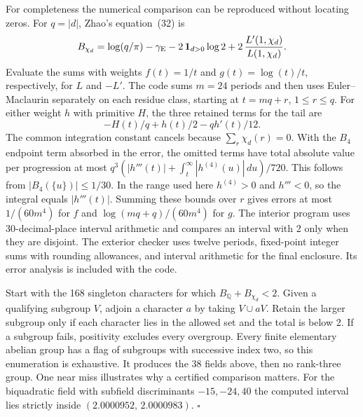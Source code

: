 \documentclass[11pt]{article}
\begin{document}
For completeness the numerical comparison can be reproduced without
locating zeros. For $q=|d|$, Zhao's equation~(32) is
\[
 B_{\chi_d}=\log(q/\pi)-\gamma_{\rm E}
      -2\,\mathbf{1}_{d>0}\log 2+
        2\,\frac{L'(1,\chi_d)}{L(1,\chi_d)} .
\]
Evaluate the sums with weights $f(t)=1/t$ and $g(t)=\log(t)/t$,
respectively, for $L$ and $-L'$. The code sums $m=24$ periods and then
uses Euler--Maclaurin separately on each residue class, starting at
$t=mq+r$, $1\le r\le q$. For either weight $h$ with primitive $H$, the
three retained terms for the tail are
\[
 -H(t)/q+h(t)/2-qh'(t)/12.
\]
The common integration constant cancels because $\sum_r\chi_d(r)=0$.
With the $B_4$ endpoint term absorbed in the error, the omitted terms
have total absolute value per progression at most
$q^3(|h'''(t)|+\int_t^\infty|h^{(4)}(u)|\,du)/720$.
This follows from $|B_4(\{u\})|\le 1/30$. In the range used here
$h^{(4)}>0$ and $h'''<0$, so the integral equals $|h'''(t)|$.
Summing these bounds over $r$ gives errors at most $1/(60m^4)$ for
$f$ and $\log(mq+q)/(60m^4)$ for $g$. The interior program uses 30-decimal-place
interval arithmetic and compares an interval with 2 only when they
are disjoint. The exterior checker uses twelve periods, fixed-point integer sums with rounding allowances, and interval arithmetic for the final enclosure. Its error analysis is included with the code.

Start with the 168 singleton characters for which
$B_{\mathbb Q}+B_{\chi_d}<2$. Given a qualifying subgroup $V$, adjoin a
character $a$ by taking $V\cup aV$. Retain the larger subgroup only if
each character lies in the allowed set and the total is below 2. If a
subgroup fails, positivity excludes every overgroup. Every finite
elementary abelian group has a flag of subgroups with successive index
two, so this enumeration is exhaustive. It produces the 38 fields above,
then no rank-three group. One near miss illustrates why a certified
comparison matters. For the biquadratic field with subfield discriminants
$-15,-24,40$ the computed interval lies strictly inside
$(2.0000952,\,2.0000983)$. \hfill$\square$
\end{document}
